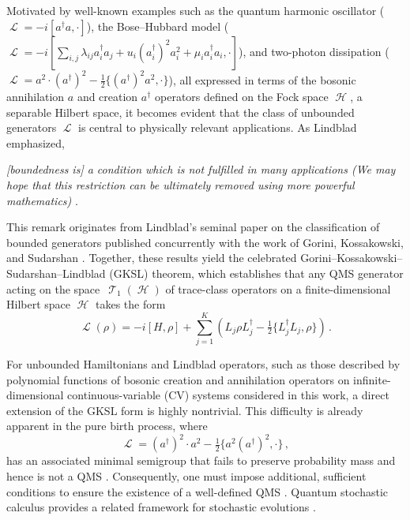 \documentclass[11pt]{article}
\theoremstyle{myplain}
\theoremstyle{mydefinition}
\theoremstyle{remark}
\DeclareMathOperator{\cH}{\mathcal{H}}
\DeclareMathOperator{\cL}{\mathcal{L}}
\DeclareMathOperator{\cT}{\mathcal{T}}
\DeclareMathOperator{\1}{\mathds{1}}
\begin{document}
    Motivated by well-known examples such as the quantum harmonic oscillator ($\cL = -i[a^\dagger a, \cdot]$), the Bose–Hubbard model ($\cL = -i[\sum_{i,j}\lambda_{ij} a_i^\dagger a_j + u_i (a_i^\dagger)^2 a_i^2 + \mu_i a_i^\dagger a_i, \cdot]$), and two-photon dissipation ($\cL = a^2 \cdot (a^\dagger)^2 - \tfrac{1}{2}\{(a^\dagger)^2 a^2, \cdot\}$), all expressed in terms of the bosonic annihilation $a$ and creation $a^\dagger$ operators defined on the Fock space $\cH$, a separable Hilbert space, it becomes evident that the class of unbounded generators $\cL$ is central to physically relevant applications. As Lindblad emphasized,
    \begin{center}
        \textit{[boundedness is] a condition which is not fulfilled in many applications (We may hope that this restriction can be ultimately removed using more powerful mathematics)} \cite[p.~120]{Lindblad.1976}.
    \end{center}
    This remark originates from Lindblad’s seminal paper \cite{Lindblad.1976} on the classification of bounded generators published concurrently with the work of Gorini, Kossakowski, and Sudarshan \cite{Gorini.1976}. Together, these results yield the celebrated Gorini–Kossakowski–Sudarshan–Lindblad (GKSL) theorem, which establishes that any QMS generator acting on the space~$\cT_1(\cH)$ of trace-class operators on a finite-dimensional Hilbert space $\cH$ takes the form
    \begin{equation}\label{eq:GKSL}
        \cL(\rho) = -i[H, \rho] + \sum_{j=1}^{K}\!\left(L_j \rho L_j^\dagger - \tfrac{1}{2}\{L_j^\dagger L_j, \rho\}\right)\,.
    \end{equation}

    For unbounded Hamiltonians and Lindblad operators, such as those described by polynomial functions of bosonic creation and annihilation operators on infinite-dimensional continuous-variable (CV) systems considered in this work, a direct extension of the GKSL form is highly nontrivial. This difficulty is already apparent in the pure birth process, where
    \begin{equation*}
        \cL = (a^\dagger)^2 \cdot a^2 - \tfrac{1}{2}\{a^2 (a^\dagger)^2, \cdot\}\,,
    \end{equation*}
    has an associated minimal semigroup that fails to preserve probability mass and hence is not a QMS \cite[Example~3.3]{Davies.1977}. Consequently, one must impose additional, sufficient conditions to ensure the existence of a well-defined QMS \cite{Chebotarev.1997,Chebotarev.1998,Chebotarev.2003,Fagnola.1999,Siemon.2017,Cipriani.2000,Carbone.2003,Gondolf.2024}. Quantum stochastic calculus provides a related framework for stochastic evolutions \cite{Hudson.1984}.
\end{document}

